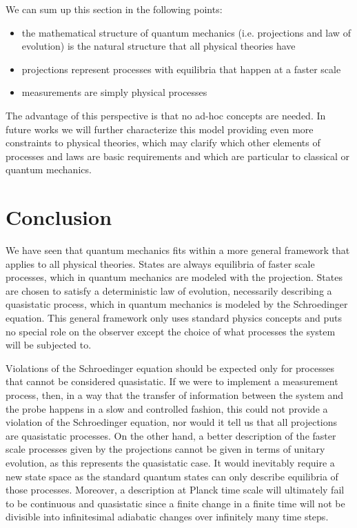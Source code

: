 \documentclass[applsci,article,submit,moreauthors,pdftex]{Definitions/mdpi}
\begin{document}
We can sum up this section in the following points:
\begin{itemize}
	\item the mathematical structure of quantum mechanics (i.e. projections and law of evolution) is the natural structure that all physical theories have
	\item projections represent processes with equilibria that happen at a faster scale 
	\item measurements are simply physical processes
\end{itemize}
The advantage of this perspective is that no ad-hoc concepts are needed. In future works we will further characterize this model providing even more constraints to physical theories, which may clarify which other elements of processes and laws are basic requirements and which are particular to classical or quantum mechanics.

\section{Conclusion}

We have seen that quantum mechanics fits within a more general framework that applies to all physical theories. States are always equilibria of faster scale processes, which in quantum mechanics are modeled with the projection. States are chosen to satisfy a deterministic law of evolution, necessarily describing a quasistatic process, which in quantum mechanics is modeled by the Schroedinger equation. This general framework only uses standard physics concepts and puts no special role on the observer except the choice of what processes the system will be subjected to.

Violations of the Schroedinger equation should be expected only for processes that cannot be considered quasistatic. If we were to implement a measurement process, then, in a way that the transfer of information between the system and the probe happens in a slow and controlled fashion, this could not provide a violation of the Schroedinger equation, nor would it tell us that all projections are quasistatic processes. On the other hand, a better description of the faster scale processes given by the projections cannot be given in terms of unitary evolution, as this represents the quasistatic case. It would inevitably require a new state space as the standard quantum states can only describe equilibria of those processes. Moreover, a description at Planck time scale will ultimately fail to be continuous and quasistatic since a finite change in a finite time will not be divisible into infinitesimal adiabatic changes over infinitely many time steps.
\end{document}
